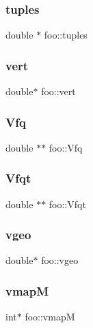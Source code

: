 \subsubsection{\texorpdfstring{tuples}{tuples}}
{\footnotesize\ttfamily double $\ast$ foo\+::tuples}

\mbox{\label{structfoo_a824058e49473a372c925d2f0307c97bc}} 
\subsubsection{\texorpdfstring{vert}{vert}}
{\footnotesize\ttfamily double$\ast$ foo\+::vert}

\mbox{\label{structfoo_a0c0c855f842f7fdc35764d378b8bbcd2}} 
\subsubsection{\texorpdfstring{Vfq}{Vfq}}
{\footnotesize\ttfamily double $\ast$$\ast$ foo\+::\+Vfq}

\mbox{\label{structfoo_a596f6707ac27acbad5fa5ab411537af1}} 
\subsubsection{\texorpdfstring{Vfqt}{Vfqt}}
{\footnotesize\ttfamily double $\ast$$\ast$ foo\+::\+Vfqt}

\mbox{\label{structfoo_ac01112b8afa5a1527b4ebec2db9954c1}} 
\subsubsection{\texorpdfstring{vgeo}{vgeo}}
{\footnotesize\ttfamily double$\ast$ foo\+::vgeo}

\mbox{\label{structfoo_a9ea84cab95059cbf986d6c088a161557}} 
\subsubsection{\texorpdfstring{vmapM}{vmapM}}
{\footnotesize\ttfamily int$\ast$ foo\+::vmapM}

